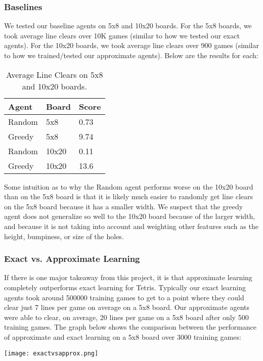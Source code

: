 \documentclass[11pt]{article}
\begin{document}
\subsubsection{Baselines}
We tested our baseline agents on 5x8 and 10x20 boards. For the 5x8 boards, we took average line clears over 10K games (similar to how we tested our exact agents). For the 10x20 boards, we took average line clears over 900 games (similar to how we trained/tested our approximate agents). Below are the results for each:
\begin{table}[H]
  \centering
  \begin{tabular}{lll}
    \toprule
    Agent & Board & Score \\
    \midrule
    Random & 5x8 & 0.73\\
    Greedy & 5x8 & 9.74\\
    Random & 10x20 & 0.11\\
    Greedy & 10x20 & 13.6\\
    \bottomrule
  \end{tabular}
  \caption{Average Line Clears on 5x8 and 10x20 boards.}
\end{table}
Some intuition as to why the Random agent performs worse on the 10x20 board than on the 5x8 board is that it is likely much easier to randomly get line clears on the 5x8 board because it has a smaller width. We suspect that the greedy agent does not generalize so well to the 10x20 board because of the larger width, and because it is not taking into account and weighting other features such as the height, bumpiness, or size of the holes.

\subsubsection{Exact vs. Approximate Learning}
If there is one major takeaway from this project, it is that approximate learning completely outperforms exact learning for Tetris. Typically our exact learning agents took around 500000 training games to get to a point where they could clear just 7 lines per game on average on a 5x8 board. Our approximate agents were able to clear, on average, 20 lines per game on a 5x8 board after only 500 training games. The graph below shows the comparison between the performance of approximate and exact learning on a 5x8 board over 3000 training games:\\
\begin{center}
    \texttt{[image: exactvsapprox.png]}
\end{center}
\end{document}
